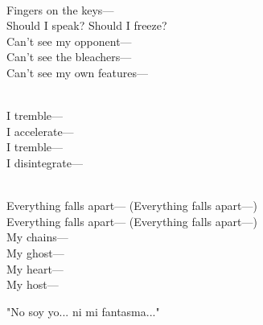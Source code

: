 \begin{lyrics}
\\
Fingers on the keys—\\
Should I speak? Should I freeze?\\
Can't see my opponent—\\
Can't see the bleachers—\\
Can't see my own features—

\\
I tremble—\\
I accelerate—\\
I tremble—\\
I disintegrate—

\\
Everything falls apart—
(Everything falls apart—)\\
Everything falls apart—
(Everything falls apart—)\\
My chains—\\
My ghost—\\
My heart—\\
My host—

"No soy yo... ni mi fantasma..."

\end{lyrics}

